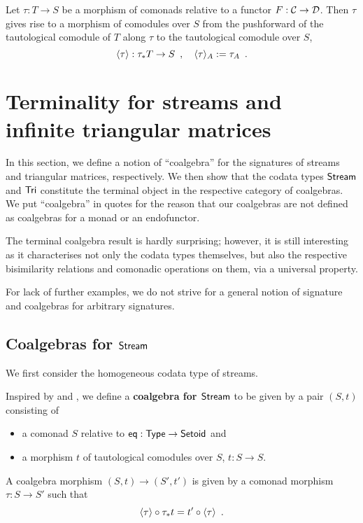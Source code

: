\documentclass{amsart}
\newcommand{\fat}[1]{\textbf{#1}}
\begin{document}
\begin{definition}\label{def:induced} %
  Let $\tau : T\to S$ be a morphism of comonads relative to a functor $F : {\mathcal{C}} \to \mathcal{D}$.
  Then $\tau$ gives rise to a morphism of comodules over $S$ from the pushforward of the tautological comodule
  of $T$ along $\tau$ to the tautological comodule over $S$,
  \[ \langle {\tau} \rangle : \tau_*T \to S \enspace , \quad \langle {\tau} \rangle_A := \tau_A \enspace . \]
\end{definition}




\section{Terminality for streams and infinite triangular matrices}\label{sec:coalgebras_for_tri}

In this section, we define a notion of \enquote{coalgebra} for the signatures of streams and triangular matrices,
respectively. We then show that the codata types $\mathsf{Stream}$ and $\mathsf{Tri}$ constitute the terminal object in
the respective category of coalgebras.
We put \enquote{coalgebra} in quotes for the reason that our coalgebras are not defined as coalgebras for a monad or an endofunctor.

The terminal coalgebra result is hardly surprising; however, it is still interesting as it characterises not only the codata types themselves,
 but also the respective bisimilarity relations and comonadic operations on them, via a universal property.
 

For lack of further examples, we do not strive for a general notion of signature and coalgebras for arbitrary signatures.

 
\subsection{Coalgebras for $\mathsf{Stream}$}


We first consider the homogeneous codata type of streams.



\begin{definition}\label{cat_stream}
  Inspired by  and , we define a \fat{coalgebra for $\mathsf{Stream}$} to be given by a pair $(S,t)$ 
  consisting of
  \begin{itemize}
   \item a comonad $S$ relative to $\mathsf{eq} : \mathsf{Type} \to \mathsf{Setoid}$ and
   \item a morphism $t$ of tautological comodules over $S$, $t : S \to S$.
  \end{itemize}
  A coalgebra morphism $(S,t) \to (S',t')$ is given by a comonad morphism $\tau : S \to S'$ such that
     \[ {\langle {\tau} \rangle} \circ {\tau_*t} = {t'} \circ {\ensuremath{\langle {\tau} \rangle}} \enspace . \]
\end{definition}
\end{document}
